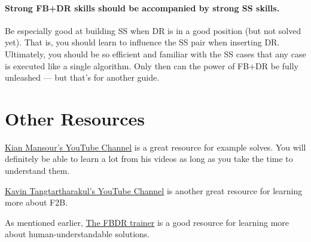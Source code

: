 \documentclass[12pt,letter]{article}
\begin{document}
\paragraph{Strong FB+DR skills should be accompanied by strong SS skills.} 

Be especially good at building SS when DR is in a good position (but not solved yet). That is, you should learn to influence the SS pair when inserting DR. Ultimately, you should be so efficient and familiar with the SS cases that any case is executed like a single algorithm. Only then can the power of FB+DR be fully unleashed --- but that’s for another guide. 

\newpage\section{Other Resources}

\href{https://www.youtube.com/user/P3NGU1N5D0NTFLY/videos}{Kian Mansour's YouTube Channel} is a great resource for example solves. You will definitely be able to learn a lot from his videos as long as you take the time to understand them.

\href{https://www.youtube.com/user/franktangtartharakul}{Kavin Tangtartharakul's YouTube Channel} is another great resource for learning more about F2B.

As mentioned earlier, \href{https://onionhoney.github.io/roux-trainers/#fbdr}{The FBDR trainer} is a good resource for learning more about human-understandable solutions.
\end{document}
